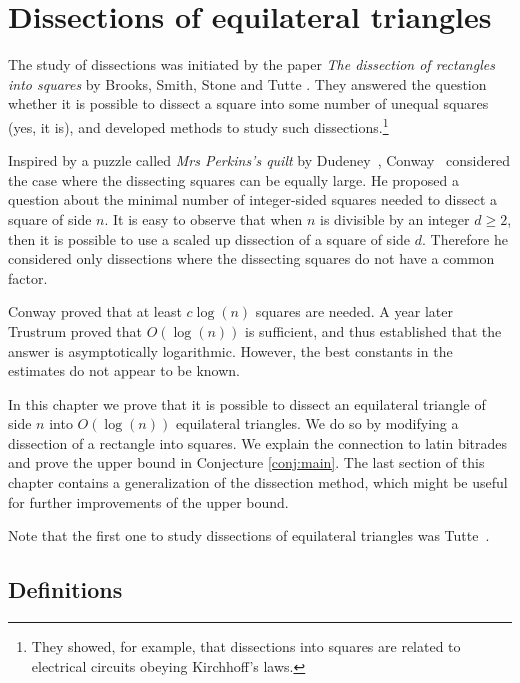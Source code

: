 \chapter{Dissections of equilateral triangles}
\label{chap:dissections}

The study of dissections was initiated by the paper \emph{The dissection of rectangles into squares} by Brooks, Smith, Stone and Tutte \cite{BrooksSmithStoneTutte40}. They answered the question whether it is possible to dissect a square into some number of unequal squares (yes, it is), and developed methods to study such dissections.\footnote{They showed, for example, that dissections into squares are related to electrical circuits obeying Kirchhoff's laws.}

Inspired by a puzzle called \emph{Mrs Perkins's quilt} by Dudeney~\cite{Dudeney17}, Conway~\cite{Conway64} considered the case where the dissecting squares can be equally large. He proposed a question about the minimal number of integer-sided squares needed to dissect a square of side $n$. It is easy to observe that when $n$ is divisible by an integer $d \geq 2$, then it is possible to use a scaled up dissection of a square of side $d$. Therefore he considered only dissections where the dissecting squares do not have a common factor.

Conway proved that at least $c \log(n)$ squares are needed. A year later Trustrum \cite{Trustrum65} proved that $O(\log(n))$ is sufficient, and thus established that the answer is asymptotically logarithmic. However, the best constants in the estimates do not appear to be known.

\bigskip

In this chapter we prove that it is possible to dissect an equilateral triangle of side $n$ into $O(\log(n))$ equilateral triangles. We do so by modifying a dissection of a rectangle into squares. We explain the connection to latin bitrades and prove the upper bound in Conjecture \ref{conj:main}. The last section of this chapter contains a generalization of the dissection method, which might be useful for further improvements of the upper bound.

\bigskip

\noindent\hspace{1em}
Note that the first one to study dissections of equilateral triangles was Tutte~\cite{Tutte48}. 


\section{Definitions}

